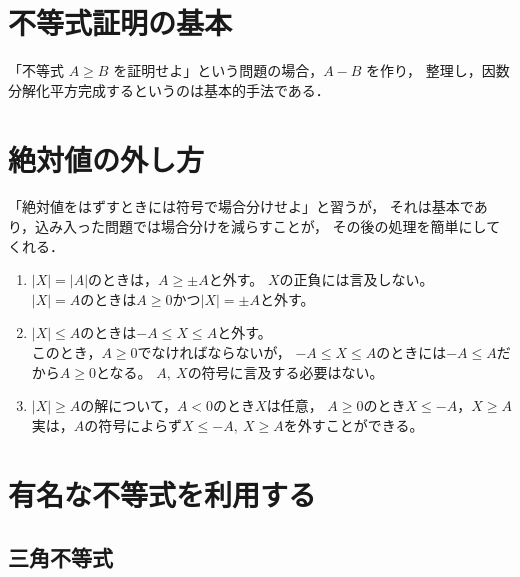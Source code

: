 \documentclass[autodetect-engine,ja=standard, 10.5pt, a4paper, titlepage]{bxjsarticle}
\numberwithin{equation}{section} %
\begin{document}
\section{不等式証明の基本}\label{sec:basis-ineq}
「不等式 $A\geq B$ を証明せよ」という問題の場合，$A-B$ を作り，
整理し，因数分解化平方完成するというのは基本的手法である．

\section{絶対値の外し方}\label{sec:how-to-getridof-abs}
「絶対値をはずすときには符号で場合分けせよ」と習うが，
それは基本であり，込み入った問題では場合分けを減らすことが，
その後の処理を簡単にしてくれる．

\begin{enumerate}[1.]
  \item 
  $|X| = |A|$のときは，$A\geq \pm A$と外す。
  $X$の正負には言及しない。\\
  $|X| = A$のときは$A\geq 0$かつ$|X| = \pm A$と外す。\\
  
  \item 
  $|X|\leq A$のときは$-A\leq X\leq A$と外す。\\
  このとき，$A\geq 0$でなければならないが，
  $-A\leq X\leq A$のときには$-A\leq A$だから$A\geq 0$となる。
  $A,\:X$の符号に言及する必要はない。\\
  
  \item 
  $|X|\geq A$の解について，$A<0$のとき$X$は任意，
  $A\geq 0$のとき$X\leq -A$，$X\geq A$\\
  実は，$A$の符号によらず$X\leq -A,\:X\geq A$を外すことができる。
\end{enumerate}

\section{有名な不等式を利用する}\label{sec:use-famous-ineqs}
\subsection{三角不等式}
\end{document}
